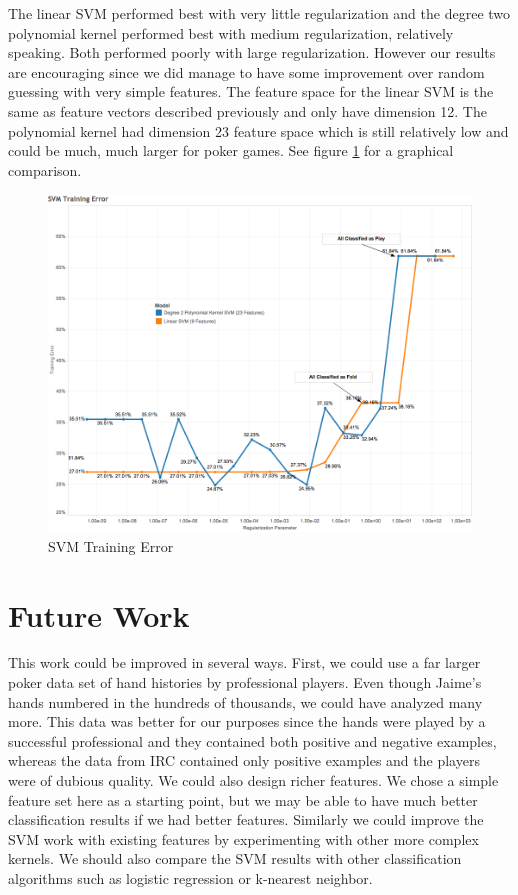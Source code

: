 \documentclass[twoside]{article}
\begin{document}
\begin{multicols}{2}
The linear SVM performed best with very little regularization and the degree two polynomial kernel performed best with medium regularization, relatively speaking. Both performed poorly with large regularization. However our results are encouraging since we did manage to have some improvement over random guessing with very simple features. The feature space for the linear SVM is the same as feature vectors described previously and only have dimension 12. The polynomial kernel had dimension 23 feature space which is still relatively low and could be much, much larger for poker games. See figure \ref{fig:SVM} for a graphical comparison.

\begin{figure}[H]
  \centering
  \centerline{\includegraphics[width=1\columnwidth]{SVM.png}}
   \caption{SVM Training Error}
  \label{fig:SVM}
\end{figure}


\section{Future Work}

This work could be improved in several ways. First, we could use a far larger poker data set of hand histories by professional players. Even though Jaime's hands numbered in the hundreds of thousands, we could have analyzed many more. This data was better for our purposes since the hands were played by a successful professional and they contained both positive and negative examples, whereas the data from IRC contained only positive examples and the players were of dubious quality. We could also design richer features. We chose a simple feature set here as a starting point, but we may be able to have much better classification results if we had better features. Similarly we could improve the SVM work with existing features by experimenting with other more complex kernels. We should also compare the SVM results with other classification algorithms such as logistic regression or k-nearest neighbor.


\end{multicols}
\end{document}
